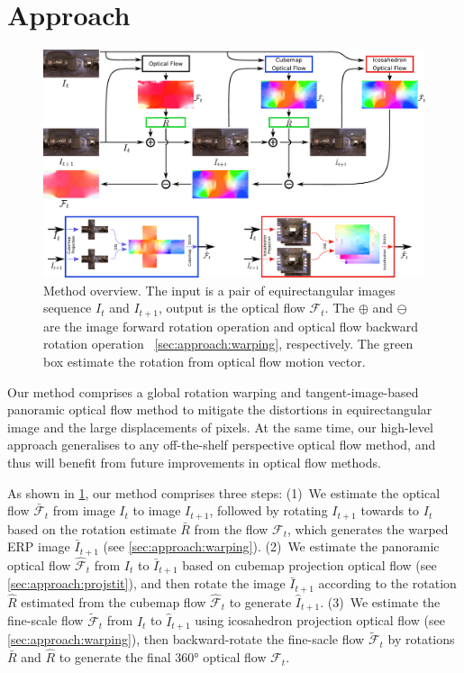 \section{Approach}\label{sec:approach}

\begin{figure}[hbt!]
	\centering
	\includegraphics[width=0.95\linewidth]{images/method_pipeline_1.pdf}
	\caption{Method overview. The input is a pair of equirectangular images sequence $I_t$ and $I_{t+1}$, output is the optical flow $\mathcal{F}_t$. The $\oplus$ and  $\ominus$ are the image forward rotation operation and optical flow backward rotation operation ~\cref{sec:approach:warping}, respectively. The green box estimate the rotation from optical flow motion vector.}
	\label{fig:approach:pipeline}
\end{figure}

Our method comprises a global rotation warping and tangent-image-based panoramic optical flow method to mitigate the distortions in equirectangular image and the large displacements of pixels.
At the same time, our high-level approach generalises to any off-the-shelf perspective optical flow method, and thus will benefit from future improvements in optical flow methods.


As shown in \cref{fig:approach:pipeline}, our method comprises three steps:
%
(1)~We estimate the optical flow $\bar{\mathcal{F}}_t$ from image $I_{t}$ to image ${I_{t+1}}$, followed by rotating $I_{t+1}$ towards to $I_{t}$ based on the rotation estimate $\bar{R}$ from the flow $\mathcal{F}_t$, which generates the warped ERP image ${\bar{I}}_{t+1}$ (see \cref{sec:approach:warping}).
%
(2)~We estimate the panoramic optical flow ${\hat{\mathcal{F}}}_t$ from $I_{t}$ to ${\bar{I}}_{t+1}$ based on cubemap projection optical flow (see \cref{sec:approach:projstit}), and then rotate the image ${\bar{I}}_{t+1}$ according to the rotation $\hat{R}$ estimated from the cubemap flow ${\hat{\mathcal{F}}}_t$ to generate ${\hat{I}}_{t+1}$.
%
(3)~We estimate the fine-scale flow $\tilde{\mathcal{F}}_t$ from $I_{t}$ to ${\hat{I}}_{t+1}$ using icosahedron projection optical flow (see \cref{sec:approach:warping}), then backward-rotate the fine-sacle flow $\tilde{\mathcal{F}}_t$ by rotations $\bar{R}$ and $\hat{R}$ to generate the final 360° optical flow $\mathcal{F}_t$.

